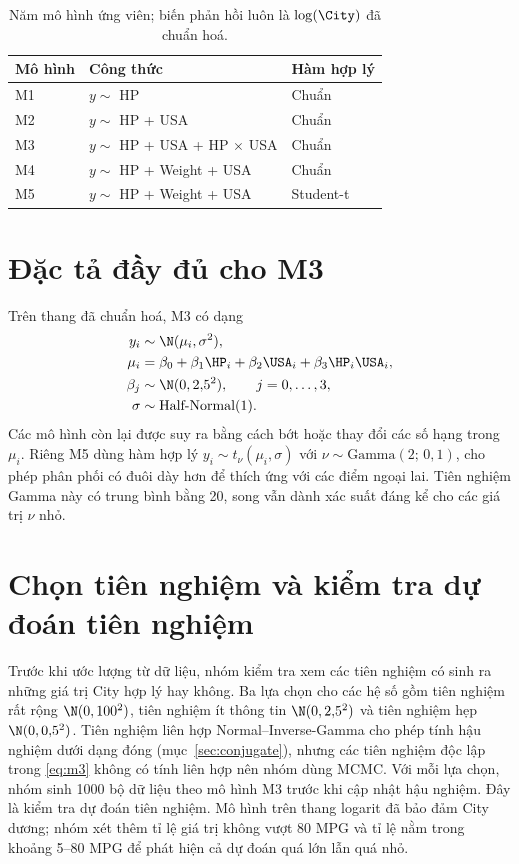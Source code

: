 \documentclass[12pt,a4paper]{report}
\begin{document}
\begin{table}[tp]
  \centering
  \caption{Năm mô hình ứng viên; biến phản hồi luôn là $\log(\City)$ đã chuẩn
    hoá.}
  \label{tab:models}
  \begin{tabular}{lll}
    \toprule
    Mô hình & Công thức & Hàm hợp lý \\
    \midrule
    M1 & $y \sim$ HP                        & Chuẩn \\
    M2 & $y \sim$ HP + USA                  & Chuẩn \\
    M3 & $y \sim$ HP + USA + HP $\times$ USA & Chuẩn \\
    M4 & $y \sim$ HP + Weight + USA         & Chuẩn \\
    M5 & $y \sim$ HP + Weight + USA         & Student-t \\
    \bottomrule
  \end{tabular}
\end{table}

\section{Đặc tả đầy đủ cho M3}

Trên thang đã chuẩn hoá, M3 có dạng
%
\begin{equation}
  \label{eq:m3}
  \begin{aligned}
    y_i &\sim \N(\mu_i, \sigma^2), \\
    \mu_i &= \beta_0 + \beta_1 \HP_i + \beta_2 \USA_i + \beta_3 \HP_i \USA_i, \\
    \beta_j &\sim \N(0, 2{,}5^2), \qquad j = 0, \dots, 3, \\
    \sigma &\sim \text{Half-Normal}(1).
  \end{aligned}
\end{equation}
%
Các mô hình còn lại được suy ra bằng cách bớt hoặc thay đổi các số hạng trong
$\mu_i$. Riêng M5 dùng hàm hợp lý $y_i \sim t_\nu(\mu_i, \sigma)$ với
$\nu \sim \text{Gamma}(2;\, 0{,}1)$, cho phép phân phối có đuôi dày hơn để thích
ứng với các điểm ngoại lai. Tiên nghiệm Gamma này có trung bình bằng 20, song
vẫn dành xác suất đáng kể cho các giá trị $\nu$ nhỏ.

\section{Chọn tiên nghiệm và kiểm tra dự đoán tiên nghiệm}
\label{sec:priors}

Trước khi ước lượng từ dữ liệu, nhóm kiểm tra xem các tiên nghiệm có sinh ra
những giá trị City hợp lý hay không. Ba lựa chọn cho các hệ số gồm tiên nghiệm rất rộng
$\N(0, 100^2)$, tiên nghiệm ít thông tin $\N(0, 2{,}5^2)$ và tiên nghiệm hẹp
$\N(0, 0{,}5^2)$. Tiên nghiệm liên hợp Normal--Inverse-Gamma cho phép tính hậu
nghiệm dưới dạng đóng (mục~\ref{sec:conjugate}), nhưng các tiên nghiệm độc lập
trong \eqref{eq:m3} không có tính liên hợp nên nhóm dùng MCMC. Với mỗi lựa chọn,
nhóm sinh \num{1000} bộ dữ liệu theo mô hình M3 trước khi cập nhật hậu nghiệm.
Đây là kiểm tra dự đoán tiên nghiệm. Mô hình trên thang logarit đã bảo đảm City
dương; nhóm xét thêm tỉ lệ giá trị không vượt 80 MPG và tỉ lệ nằm trong khoảng
5--80 MPG để phát hiện cả dự đoán quá lớn lẫn quá nhỏ.
\end{document}
